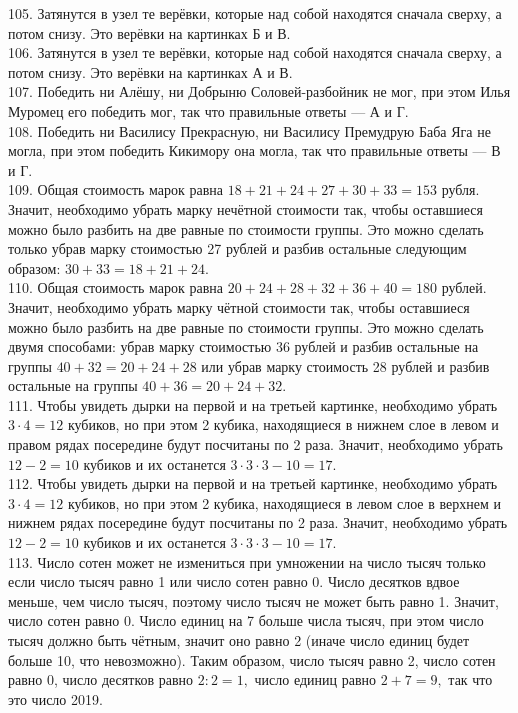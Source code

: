 \documentclass[12pt]{article}
\begin{document}
105. Затянутся в узел те верёвки, которые над собой находятся сначала сверху, а потом снизу. Это верёвки на картинках Б и В.\\
106. Затянутся в узел те верёвки, которые над собой находятся сначала сверху, а потом снизу. Это верёвки на картинках А и В.\\
107. Победить ни Алёшу, ни Добрыню Соловей-разбойник не мог, при этом Илья Муромец его победить мог, так что правильные ответы --- А и Г.\\
108. Победить ни Василису Прекрасную, ни Василису Премудрую Баба Яга не могла, при этом победить Кикимору она могла, так что правильные ответы --- В и Г.\\
109. Общая стоимость марок равна $18+21+24+27+30+33=153$ рубля. Значит, необходимо убрать марку нечётной стоимости так, чтобы оставшиеся можно было разбить на две равные по стоимости группы. Это можно сделать только убрав марку стоимостью 27 рублей и разбив остальные следующим образом: $30+33=18+21+24.$\\
110. Общая стоимость марок равна $20+24+28+32+36+40=180$ рублей. Значит, необходимо убрать марку чётной стоимости так, чтобы оставшиеся можно было разбить на две равные по стоимости группы. Это можно сделать двумя способами: убрав марку стоимостью 36 рублей и разбив остальные на группы $40+32=20+24+28$ или убрав марку стоимость 28 рублей и разбив остальные на группы $40+36=20+24+32.$\\
111. Чтобы увидеть дырки на первой и на третьей картинке, необходимо убрать $3\cdot4=12$ кубиков, но при этом 2 кубика, находящиеся в нижнем слое в левом и правом рядах посередине будут посчитаны по 2 раза. Значит, необходимо убрать $12-2=10$ кубиков и их останется $3\cdot3\cdot3-10=17.$\\
112. Чтобы увидеть дырки на первой и на третьей картинке, необходимо убрать $3\cdot4=12$ кубиков, но при этом 2 кубика, находящиеся в левом слое в верхнем и нижнем рядах посередине будут посчитаны по 2 раза. Значит, необходимо убрать $12-2=10$ кубиков и их останется $3\cdot3\cdot3-10=17.$\\
113. Число сотен может не измениться при умножении на число тысяч только если число тысяч равно 1 или число сотен равно 0. Число десятков вдвое меньше, чем число тысяч, поэтому число тысяч не может быть равно 1. Значит, число сотен равно 0. Число единиц на 7 больше числа тысяч, при этом число тысяч должно быть чётным, значит оно равно 2 (иначе число единиц будет больше 10, что невозможно). Таким образом, число тысяч равно 2, число сотен равно 0, число десятков равно $2:2=1,$ число единиц равно $2+7=9,$ так что это число 2019.\\
\end{document}
